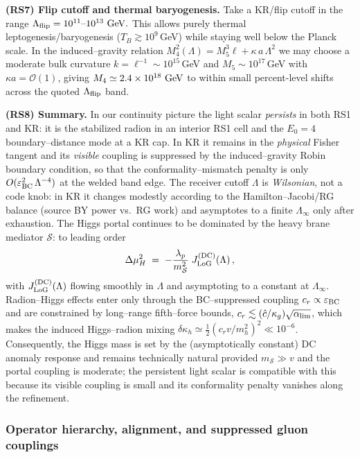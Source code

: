 \documentclass[10pt]{article}
\theoremstyle{definition}
\theoremstyle{plain}
\begin{document}
\medskip
\noindent\textbf{(RS7) Flip cutoff and thermal baryogenesis.}
Take a KR/flip cutoff in the range
\(
\Lambda_{\rm flip}=10^{11}\text{--}10^{13}\ {\rm GeV}.
\)
This allows purely thermal leptogenesis/baryogenesis ($T_B\gtrsim 10^9$\,GeV) while staying
well below the Planck scale. In the induced–gravity relation
\(
M_4^2(\Lambda)=M_5^3\ell+\kappa\,a\,\Lambda^2
\)
we may choose a moderate bulk curvature $k=\ell^{-1}\sim 10^{15}$\,GeV and
$M_5\sim 10^{17}$\,GeV with $\kappa a=\mathcal O(1)$, giving
\(
M_4\simeq 2.4\times 10^{18}{\rm\ GeV}
\)
to within small percent-level shifts across the quoted $\Lambda_{\rm flip}$ band.



\medskip
\noindent\textbf{(RS8) Summary.}
In our continuity picture the light scalar \emph{persists} in both RS1 and KR: it is the stabilized radion in an interior RS1 cell and the $E_0=4$ boundary–distance mode at a KR cap. In KR it remains in the \emph{physical} Fisher tangent and its \emph{visible} coupling is suppressed by the induced–gravity Robin boundary condition, so that the conformality–mismatch penalty is only
$O(\varepsilon_{\rm BC}^2\,\Lambda^{-4})$ at the welded band edge. The receiver cutoff \(\Lambda\) is \emph{Wilsonian}, not a code knob: in KR it changes modestly according to the Hamilton–Jacobi/RG balance (source BY power vs.\ RG work) and asymptotes to a finite \(\Lambda_\infty\) only after exhaustion. The Higgs portal continues to be dominated by the heavy brane mediator \(\mathcal S\): to leading order
\[
\Delta\mu_H^2\;=\;-\frac{\lambda_p}{m_{\mathcal S}^2}\;J_{\rm LoG}^{\rm (DC)}(\Lambda)\,,
\]
with \(J_{\rm LoG}^{\rm (DC)}(\Lambda)\) flowing smoothly in \(\Lambda\) and asymptoting to a constant at \(\Lambda_\infty\).
Radion–Higgs effects enter only through the BC–suppressed coupling \(c_r\propto \varepsilon_{\rm BC}\) and are constrained by long–range fifth–force bounds, \(c_r\lesssim (\hat c/\kappa_g)\sqrt{\alpha_{\rm lim}}\), which makes the induced Higgs–radion mixing \(\delta\kappa_h\simeq \tfrac12(c_r v/m_h^2)^2\ll 10^{-6}\).
Consequently, the Higgs mass is set by the (asymptotically constant) DC anomaly response and remains technically natural provided \(m_{\mathcal S}\gg v\) and the portal coupling is moderate; the persistent light scalar is compatible with this because its visible coupling is small and its conformality penalty vanishes along the refinement.


\subsubsection*{Operator hierarchy, alignment, and suppressed gluon couplings}
\label{subsubsec:selection-gluons}
\end{document}
